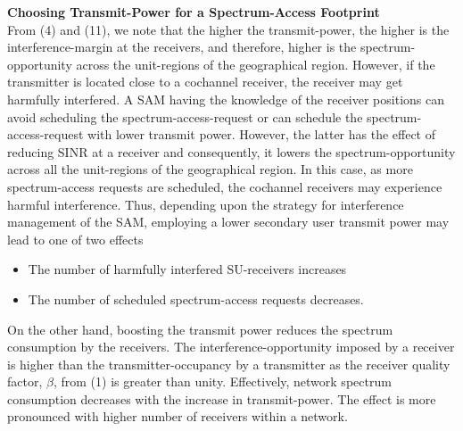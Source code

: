 \documentclass[12pt, draftclsnofoot, onecolumn]{IEEEtran}
\begin{document}
\noindent
\textbf{Choosing Transmit-Power for a Spectrum-Access Footprint}\\
From (4) and (11), we note that the higher the transmit-power, the higher is the interference-margin at the receivers, and therefore, higher is the spectrum-opportunity across the unit-regions of the geographical region. However, if the transmitter is located close to a cochannel receiver, the receiver may get harmfully interfered. A SAM having the knowledge of the receiver positions can avoid scheduling the spectrum-access-request or can schedule the spectrum-access-request with lower transmit power. However, the latter has the effect of reducing SINR at a receiver and consequently, it lowers the spectrum-opportunity across all the unit-regions of the geographical region. In this case, as more spectrum-access requests are scheduled, the cochannel receivers may experience harmful interference. Thus, depending upon the strategy for interference management of the SAM, employing a lower secondary user transmit power may lead to one of two effects
\begin{itemize}
	\item The number of harmfully interfered SU-receivers increases
	\item The number of scheduled spectrum-access requests decreases.
\end{itemize}
On the other hand, boosting the transmit power reduces the spectrum consumption by the receivers. The interference-opportunity imposed by a receiver is higher than the transmitter-occupancy by a transmitter as the receiver quality factor, $\beta$, from (1) is greater than unity. Effectively, network spectrum consumption decreases with the increase in transmit-power. The effect is more pronounced with higher number of receivers within a network.
\end{document}
